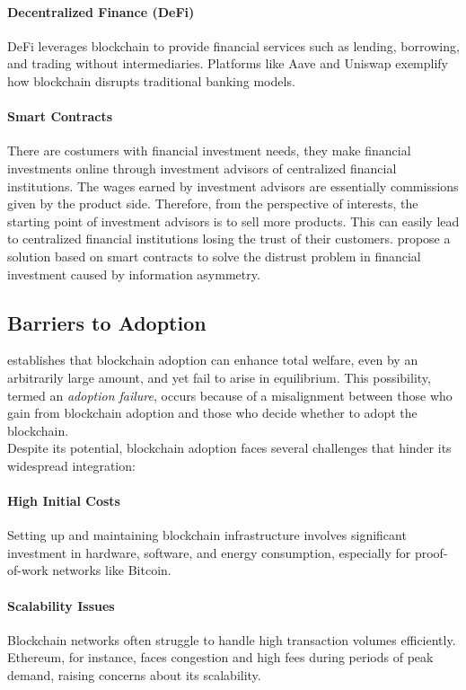 \paragraph{Decentralized Finance (DeFi)}
DeFi leverages blockchain to provide financial services such as lending, borrowing, and trading without intermediaries. Platforms like Aave and Uniswap exemplify how blockchain disrupts traditional banking models.

\paragraph{Smart Contracts}
There are costumers with financial investment needs, they make financial investments online through investment advisors of centralized financial institutions. The wages earned by investment advisors are essentially commissions given by the product side. Therefore, from the perspective of interests, the starting point of investment advisors is to sell more products. This can easily lead to centralized financial institutions losing the trust of their customers.
 propose a solution based on smart contracts to  solve the distrust problem in financial investment caused by information asymmetry. 


\subsection{Barriers to Adoption}
 establishes that blockchain adoption can enhance total welfare, even by an arbitrarily large amount, and yet fail to arise in equilibrium. This possibility, termed an \textit{adoption failure}, occurs because of a misalignment between those who gain from blockchain adoption and those who decide whether to adopt the blockchain. \\
Despite its potential, blockchain adoption faces several challenges that hinder its widespread integration:

\paragraph{High Initial Costs}
Setting up and maintaining blockchain infrastructure involves significant investment in hardware, software, and energy consumption, especially for proof-of-work networks like Bitcoin.

\paragraph{Scalability Issues}
Blockchain networks often struggle to handle high transaction volumes efficiently. Ethereum, for instance, faces congestion and high fees during periods of peak demand, raising concerns about its scalability. \cite{hinzen_bitcoins_2022}

